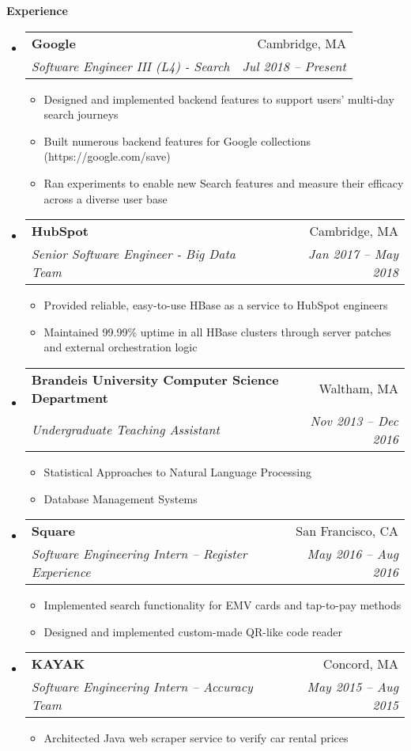 \documentclass[letterpaper,11pt]{article}
\makeatletter
\newcommand{\resitem}[1]{\item #1 \vspace{-2pt}}
\newcommand{\resheading}[1]{{\large \colorbox{mygrey}{\begin{minipage}{\textwidth}{\textbf{#1 \vphantom{p\^{E}}}}\end{minipage}}}}
\newcommand{\ressubheading}[4]{
\begin{tabular*}{6.5in}{l@{\extracolsep{\fill}}r}
		\textbf{#1} & #2 \\
		\textit{#3} & \textit{#4} \\
\end{tabular*}\vspace{-6pt}}
\makeatother
\begin{document}
\resheading{Experience}
\begin{itemize}
		
	\item
	      \ressubheading{Google}{Cambridge, MA}
	      {Software Engineer III (L4) - Search}{Jul 2018 -- Present}
	      {\footnotesize
	      	\begin{itemize}
	      		\resitem{Designed and implemented backend features to support users' multi-day search journeys}
	      		\resitem{Built numerous backend features for Google collections (https://google.com/save)}
	      		\resitem{Ran experiments to enable new Search features and measure their efficacy across a diverse user base}
	      	\end{itemize}
	      }
	\item
	      \ressubheading{HubSpot}{Cambridge, MA}
	      {Senior Software Engineer - Big Data Team}{Jan 2017 -- May 2018}
	      {\footnotesize
	      	\begin{itemize}
	      		\resitem{Provided reliable, easy-to-use HBase as a service to HubSpot engineers}
	      		\resitem{Maintained 99.99\% uptime in all HBase clusters through server patches and external orchestration logic}
	      	\end{itemize}
	      }
	\item
	      \ressubheading{Brandeis University Computer Science Department}{Waltham, MA}
	      {Undergraduate Teaching Assistant}{Nov 2013 -- Dec 2016}
	      {\footnotesize
	      	\begin{itemize}
	      		\resitem{Statistical Approaches to Natural Language Processing}
	      		\resitem{Database Management Systems}
	      	\end{itemize}
	      }
	      
	\item
	      \ressubheading{Square}{San Francisco, CA}
	      {Software Engineering Intern -- Register Experience}{May 2016 -- Aug 2016}
	      {\footnotesize
	      	\begin{itemize}
	      		\resitem{Implemented search functionality for EMV cards and tap-to-pay methods}
	      		\resitem{Designed and implemented custom-made QR-like code reader}
	      	\end{itemize}
	      }
	      
	\item
	      \ressubheading{KAYAK}{Concord, MA}
	      {Software Engineering Intern -- Accuracy Team}{May 2015 -- Aug 2015}
	      {\footnotesize
	      	\begin{itemize}
	      		\resitem{Architected Java web scraper service to verify car rental prices}
	      	\end{itemize}
	      }
	      

\end{itemize}
\end{document}
